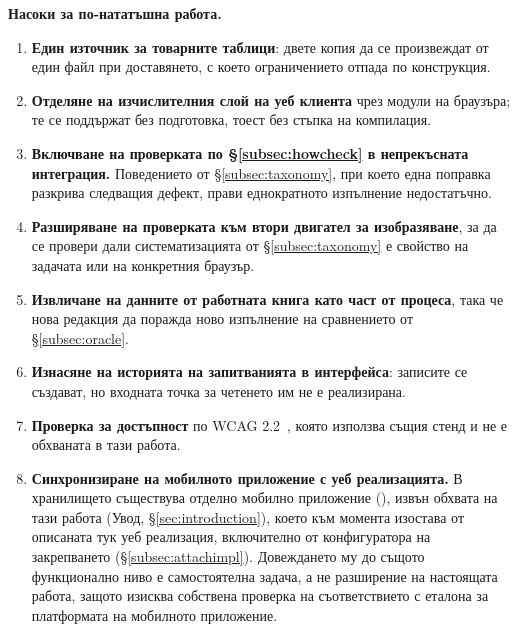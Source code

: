 \textbf{Насоки за по-нататъшна работа.}
\begin{enumerate}[topsep=2pt,itemsep=1pt,leftmargin=*]
\item \textbf{Един източник за товарните таблици}: двете копия да се произвеждат от
      един файл при доставянето, с което ограничението отпада по конструкция.
\item \textbf{Отделяне на изчислителния слой на уеб клиента} чрез модули на браузъра;
      те се поддържат без подготовка, тоест без стъпка на компилация.
\item \textbf{Включване на проверката по §\ref{subsec:howcheck} в непрекъсната
      интеграция.} Поведението от §\ref{subsec:taxonomy}, при което една поправка
      разкрива следващия дефект, прави еднократното изпълнение недостатъчно.
\item \textbf{Разширяване на проверката към втори двигател за изобразяване}, за да се
      провери дали систематизацията от §\ref{subsec:taxonomy} е свойство на задачата
      или на конкретния браузър.
\item \textbf{Извличане на данните от работната книга като част от процеса}, така че
      нова редакция да поражда ново изпълнение на сравнението от §\ref{subsec:oracle}.
\item \textbf{Изнасяне на историята на запитванията в интерфейса}: записите се създават,
      но входната точка за четенето им не е реализирана.
\item \textbf{Проверка за достъпност} по WCAG 2.2~\cite{wcag22}, която използва същия
      стенд и не е обхваната в тази работа.
\item \textbf{Синхронизиране на мобилното приложение с уеб реализацията.} В
      хранилището съществува отделно мобилно приложение (), извън
      обхвата на тази работа (Увод, §\ref{sec:introduction}), което към момента
      изостава от описаната тук уеб реализация, включително от конфигуратора на
      закрепването (§\ref{subsec:attachimpl}). Довеждането му до същото функционално
      ниво е самостоятелна задача, а не разширение на настоящата работа, защото изисква
      собствена проверка на съответствието с еталона за платформата на мобилното
      приложение.
\end{enumerate}
